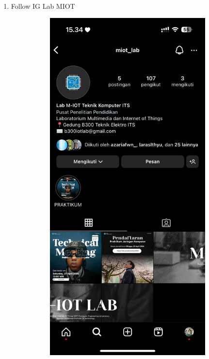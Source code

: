 \begin{enumerate}
\begin{itemize}
	\end{itemize}

	\item Follow IG Lab MIOT
	\begin{figure}[H]
		\centering
		\begin{subfigure}{0.3\linewidth}
			\centering
			\includegraphics[width=\linewidth]{P1/img/vanfollow.jpg}

\end{subfigure}
\end{figure}
\end{enumerate}

